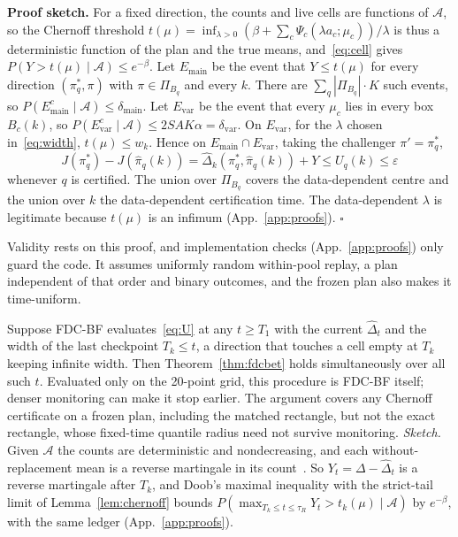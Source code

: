 \documentclass[sigconf,anonymous,review]{acmart}
\newcommand{\cA}{\mathcal{A}}
\newcommand{\eps}{\varepsilon}
\newcommand{\dmain}{\delta_{\text{main}}}
\newcommand{\dvar}{\delta_{\text{var}}}
\begin{document}
\textbf{Proof sketch.} For a fixed direction, the counts and live cells are functions of $\cA$, so the Chernoff threshold $t(\mu) = \inf_{\lambda>0}(\beta + \sum_c \Psi_c(\lambda a_c;\mu_c))/\lambda$ is thus a deterministic function of the plan and the true means, and~\eqref{eq:cell} gives $P(Y > t(\mu) \mid \cA) \le e^{-\beta}$. Let $E_{\text{main}}$ be the event that $Y \le t(\mu)$ for every direction $(\pi^*_q, \pi)$ with $\pi \in \Pi_{B_q}$ and every $k$. There are $\sum_q|\Pi_{B_q}|\cdot K$ such events, so $P(E_{\text{main}}^c \mid \cA) \le \dmain$. Let $E_{\text{var}}$ be the event that every $\mu_c$ lies in every box $B_c(k)$, so $P(E_{\text{var}}^c \mid \cA) \le 2SAK\alpha = \dvar$. On $E_{\text{var}}$, for the $\lambda$ chosen in~\eqref{eq:width}, $t(\mu) \le w_k$. Hence on $E_{\text{main}} \cap E_{\text{var}}$, taking the challenger $\pi' = \pi^*_q$,
\[
J(\pi^*_q) - J(\hat\pi_q(k)) = \hat\Delta_k(\pi^*_q, \hat\pi_q(k)) + Y \le U_q(k) \le \eps
\]
whenever $q$ is certified. The union over $\Pi_{B_q}$ covers the data-dependent centre and the union over $k$ the data-dependent certification time. The data-dependent $\lambda$ is legitimate because $t(\mu)$ is an infimum (App.~\ref{app:proofs}). $\square$

Validity rests on this proof, and implementation checks (App.~\ref{app:proofs}) only guard the code. It assumes uniformly random within-pool replay, a plan independent of that order and binary outcomes, and the frozen plan also makes it time-uniform.

\begin{remark}\label{rem:tu}
Suppose FDC-BF evaluates~\eqref{eq:U} at any $t \ge T_1$ with the current $\hat\Delta_t$ and the width of the last checkpoint $T_k \le t$, a direction that touches a cell empty at $T_k$ keeping infinite width. Then Theorem~\ref{thm:fdcbet} holds simultaneously over all such $t$. Evaluated only on the 20-point grid, this procedure is FDC-BF itself; denser monitoring can make it stop earlier. The argument covers any Chernoff certificate on a frozen plan, including the matched rectangle, but not the exact rectangle, whose fixed-time quantile radius need not survive monitoring. \emph{Sketch.} Given $\cA$ the counts are deterministic and nondecreasing, and each without-replacement mean is a reverse martingale in its count~\citep{serfling1974probability,bardenet2015concentration}. So $Y_t = \Delta - \hat\Delta_t$ is a reverse martingale after $T_k$, and Doob's maximal inequality with the strict-tail limit of Lemma~\ref{lem:chernoff} bounds $P(\max_{T_k \le t \le \tau_R} Y_t > t_k(\mu) \mid \cA)$ by $e^{-\beta}$, with the same ledger (App.~\ref{app:proofs}).
\end{remark}
\end{document}
